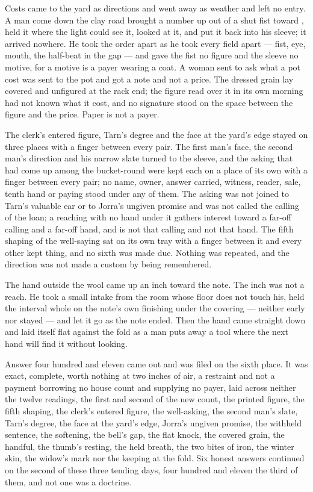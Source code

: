 Costs came to the yard as directions and went away as weather and left no entry. A man come down the clay road brought a number up out of a shut fist toward , held it where the light could see it, looked at it, and put it back into his sleeve; it arrived nowhere. He took the order apart as he took every field apart --- fist, eye, mouth, the half-beat in the gap --- and gave the fist no figure and the sleeve no motive, for a motive is a payer wearing a coat. A woman sent to ask what a pot cost was sent to the pot and got a note and not a price. The dressed grain lay covered and unfigured at the rack end; the figure read over it in its own morning had not known what it cost, and no signature stood on the space between the figure and the price. Paper is not a payer.

The clerk's entered figure, Tarn's degree and the face at the yard's edge stayed on three places with a finger between every pair. The first man's face, the second man's direction and his narrow slate turned to the sleeve, and the asking that had come up among the bucket-round were kept each on a place of its own with a finger between every pair; no name, owner, answer carried, witness, reader, sale, tenth hand or paying stood under any of them. The asking was not joined to Tarn's valuable ear or to Jorra's ungiven promise and was not called the calling of the loan; a reaching with no hand under it gathers interest toward a far-off calling and a far-off hand, and is not that calling and not that hand. The fifth shaping of the well-saying sat on its own tray with a finger between it and every other kept thing, and no sixth was made due. Nothing was repeated, and the direction was not made a custom by being remembered.

The hand outside the wool came up an inch toward the note. The inch was not a reach. He took a small intake from the room whose floor does not touch his, held the interval whole on the note's own finishing under the covering --- neither early nor stayed --- and let it go as the note ended. Then the hand came straight down and laid itself flat against the fold as a man puts away a tool where the next hand will find it without looking.

Answer four hundred and eleven came out and was filed on the sixth place. It was exact, complete, worth nothing at two inches of air, a restraint and not a payment borrowing no house count and supplying no payer, laid across neither the twelve readings, the first and second of the new count, the printed figure, the fifth shaping, the clerk's entered figure, the well-asking, the second man's slate, Tarn's degree, the face at the yard's edge, Jorra's ungiven promise, the withheld sentence, the softening, the bell's gap, the flat knock, the covered grain, the handful, the thumb's resting, the held breath, the two bites of iron, the winter skin, the widow's mark nor the keeping at the fold. Six honest answers continued on the second of these three tending days, four hundred and eleven the third of them, and not one was a doctrine.

